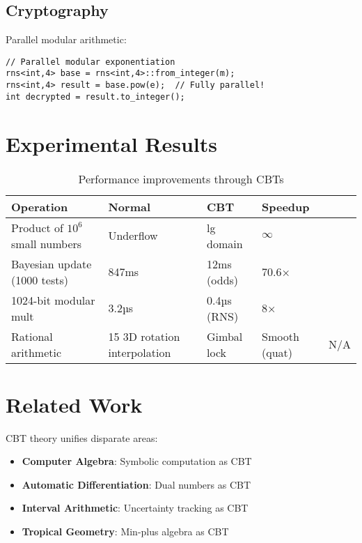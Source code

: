\documentclass[12pt,a4paper]{article}
\theoremstyle{definition}
\begin{document}
\subsection{Cryptography}

Parallel modular arithmetic:

\begin{lstlisting}[caption={RSA using RNS}]
// Parallel modular exponentiation
rns<int,4> base = rns<int,4>::from_integer(m);
rns<int,4> result = base.pow(e);  // Fully parallel!
int decrypted = result.to_integer();
\end{lstlisting}

\section{Experimental Results}

\begin{table}[h]
\centering
\begin{tabular}{@{}llll@{}}
\toprule
Operation & Normal & CBT & Speedup \\
\midrule
Product of $10^6$ small numbers & Underflow & lg domain & $\infty$ \\
Bayesian update (1000 tests) & 847ms & 12ms (odds) & 70.6× \\
1024-bit modular mult & 3.2µs & 0.4µs (RNS) & 8× \\
Rational arithmetic & 15%
3D rotation interpolation & Gimbal lock & Smooth (quat) & N/A \\
\bottomrule
\end{tabular}
\caption{Performance improvements through CBTs}
\end{table}

\section{Related Work}

CBT theory unifies disparate areas:
\begin{itemize}
\item \textbf{Computer Algebra}: Symbolic computation as CBT
\item \textbf{Automatic Differentiation}: Dual numbers as CBT
\item \textbf{Interval Arithmetic}: Uncertainty tracking as CBT
\item \textbf{Tropical Geometry}: Min-plus algebra as CBT
\end{itemize}
\end{document}
